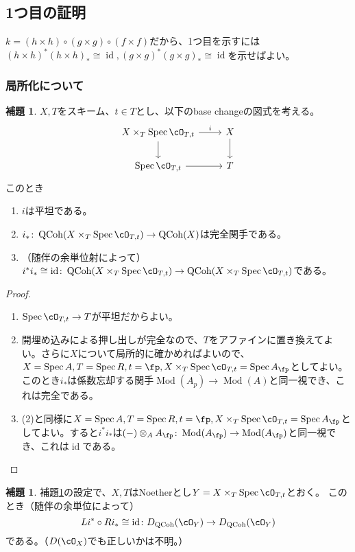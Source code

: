 \documentclass[uplatex, a4paper, dvipdfmx]{jsarticle}
\theoremstyle{definition}
\newtheorem{lemma}[theorem]{補題}
\DeclareMathOperator{\id}{\mathrm{id}}
\DeclareMathOperator{\Spec}{\mathrm{Spec}}
\DeclareMathOperator{\QCoh}{\mathrm{QCoh}}
\DeclareMathOperator{\Mod}{\mathrm{Mod}}
\begin{document}
\subsection{1つ目の証明}
$k = (h \times h) \circ (g \times g) \circ (f \times f)$だから、1つ目を示すには$(h \times h)^*(h \times h)_* \cong \id, (g \times g)^*(g \times g)_* \cong \id$を示せばよい。
\subsubsection{局所化について}
\begin{lemma}\label{lem:base-change-by-localizaion}
    $X, T$をスキーム、$t \in T$とし、以下のbase changeの図式を考える。
    \[
        \begin{tikzcd}
            X \times_T \Spec \cO_{T, t} \ar[r, "i"] \ar[d]& X \ar[d]\\
            \Spec \cO_{T, t} \ar[r]& T
        \end{tikzcd}
    \]
    このとき
    \begin{enumerate}
        \item $i$は平坦である。
        \item $i_* \colon \QCoh(X \times_T \Spec \cO_{T, t}) \to \QCoh(X)$は完全関手である。
        \item （随伴の余単位射によって）$i^*i_* \cong \id \colon \QCoh( X \times_T \Spec \cO_{T, t}) \to \QCoh( X \times_T \Spec \cO_{T, t})$である。
    \end{enumerate}
\end{lemma}
\begin{proof}
    \begin{enumerate}
        \item $\Spec \cO_{T, t} \to T$が平坦だからよい。
        \item 開埋め込みによる押し出しが完全なので、$T$をアファインに置き換えてよい。さらに$X$について局所的に確かめればよいので、$X = \Spec A, T = \Spec R, t = \fp, X \times_T \Spec \cO_{T, t} = \Spec A_{\fp}$としてよい。このとき$i_*$は係数忘却する関手$\Mod(A_p) \to \Mod(A)$と同一視でき、これは完全である。
        \item (2)と同様に$X = \Spec A, T = \Spec R, t = \fp, X \times_T \Spec \cO_{T, t} = \Spec A_{\fp}$としてよい。すると$i^*i_*$は$(-)\otimes_A A_{\fp} \colon \Mod(A_{\fp}) \to \Mod(A_{\fp})$と同一視でき、これは$\id$である。
    \end{enumerate}
\end{proof}
\begin{lemma}
    補題\ref{lem:base-change-by-localizaion}の設定で、$X, T$はNoetherとし$Y =  X \times_T \Spec \cO_{T, t}$とおく。
    このとき（随伴の余単位によって）
    \begin{equation}
        Li^* \circ Ri_* \cong \id \colon D_{\QCoh}(\cO_Y) \to D_{\QCoh}(\cO_Y)
    \end{equation}
    である。（$D(\cO_X)$でも正しいかは不明。）
\end{lemma}
\end{document}
